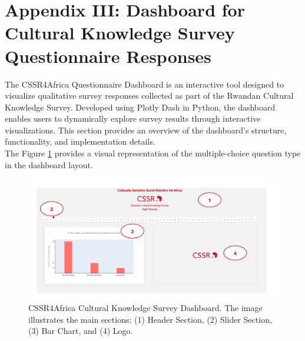 \documentclass{CSSRforAfrica}
\begin{document}
\newpage
\section*{Appendix III: Dashboard for Cultural Knowledge Survey Questionnaire Responses}
\label{section: appendixiii}
The CSSR4Africa Questionnaire Dashboard is an interactive tool designed to visualize qualitative survey responses collected as part of the Rwandan Cultural Knowledge Survey. Developed using Plotly Dash in Python, the dashboard enables users to dynamically explore survey results through interactive visualizations. This section provides an overview of the dashboard's structure, functionality, and implementation details.\\
The Figure \ref{fig:dashboard3} provides a visual representation of the multiple-choice question type in the dashboard layout.
\begin{figure}[H]
    \centering
    \includegraphics[width=\textwidth]{images/dashboard3.png} 
    \caption{CSSR4Africa Cultural Knowledge Survey Dashboard. The image illustrates the main sections: (1) Header Section, (2) Slider Section, (3) Bar Chart, and (4) Logo.}
    \label{fig:dashboard3}
\end{figure}
\end{document}
